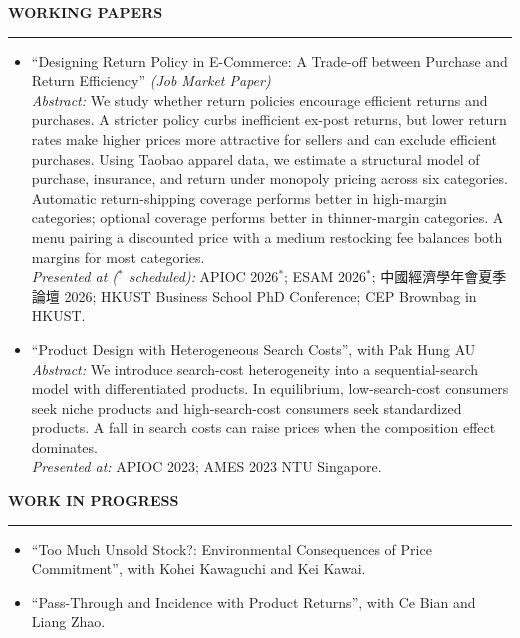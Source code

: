 \documentclass[11pt,letterpaper]{article}
\newcommand{\sectionheader}[1]{%
  \vspace{0.5em}
  {\large\bfseries #1}\\[-0.15em]
  \rule{\textwidth}{0.4pt}\par
  \vspace{0.22em}
}
\begin{document}
\vspace{-0.5em}
\sectionheader{WORKING PAPERS}
\begin{itemize}
  \item ``Designing Return Policy in E-Commerce: A Trade-off between Purchase and Return Efficiency'' \textit{(Job Market Paper)}\\[0.15em]
  \textit{Abstract:} We study whether return policies encourage efficient returns and purchases. A stricter policy curbs inefficient ex-post returns, but lower return rates make higher prices more attractive for sellers and can exclude efficient purchases. Using Taobao apparel data, we estimate a structural model of purchase, insurance, and return under monopoly pricing across six categories. Automatic return-shipping coverage performs better in high-margin categories; optional coverage performs better in thinner-margin categories. A menu pairing a discounted price with a medium restocking fee balances both margins for most categories.\\[0.1em]
  \textit{Presented at ($^{\ast}$ scheduled):} APIOC 2026$^{\ast}$; ESAM 2026$^{\ast}$; 中國經濟學年會夏季論壇 2026; HKUST Business School PhD Conference; CEP Brownbag in HKUST.

  \item ``Product Design with Heterogeneous Search Costs'', with Pak Hung AU\\[0.15em]
  \textit{Abstract:} We introduce search-cost heterogeneity into a sequential-search model with differentiated products. In equilibrium, low-search-cost consumers seek niche products and high-search-cost consumers seek standardized products. A fall in search costs can raise prices when the composition effect dominates.\\[0.1em]
  \textit{Presented at:} APIOC 2023; AMES 2023 NTU Singapore.
\end{itemize}

\sectionheader{WORK IN PROGRESS}
\begin{itemize}
  \item ``Too Much Unsold Stock?: Environmental Consequences of Price Commitment'', with Kohei Kawaguchi and Kei Kawai.
  \item ``Pass-Through and Incidence with Product Returns'', with Ce Bian and Liang Zhao.
\end{itemize}
\end{document}
